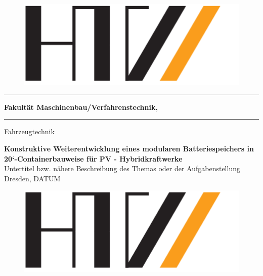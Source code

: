 \documentclass[a4paper, 10pt, titlepage]{scrreprt}
\begin{document}
\begin{titlepage}
\thispagestyle{empty} 		%
\linespread{1.0}

\begin{figure}
\includegraphics[scale=0.3]{images/HTW-Logo}
\end{figure}


\hrule
\vspace{0.2 cm}
\textbf{Fakultät Maschinenbau/Verfahrenstechnik,}
\vspace{0.1 cm}
\hrule
\vspace{0.2 cm}
Fahrzeugtechnik 



\begin{flushleft}
\vspace{8 cm}
\huge\textbf{Konstruktive Weiterentwicklung eines modularen Batteriespeichers  in  
20‘-Containerbauweise für PV - Hybridkraftwerke}\\ [0.5 cm]
\Large{Untertitel bzw. nähere Beschreibung des Themas oder der Aufgabenstellung}\\ [1.5 cm]
\Large{Dresden, DATUM}
\end{flushleft}

\pagebreak 

\thispagestyle{empty} 		%

\begin{figure}
\includegraphics[scale=0.3]{images/HTW-Logo}
\end{figure}


\end{titlepage}
\end{document}
